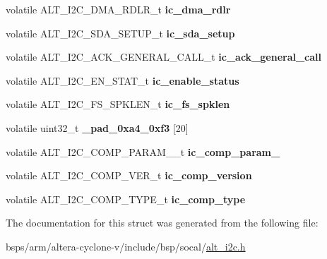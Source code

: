 \begin{DoxyCompactItemize}
\item 
\mbox{\label{structALT__I2C__s_a0cb8118328eaa91abb451ff4725f5c2a}} 
volatile A\+L\+T\+\_\+\+I2\+C\+\_\+\+D\+M\+A\+\_\+\+R\+D\+L\+R\+\_\+t {\bfseries ic\+\_\+dma\+\_\+rdlr}
\item 
\mbox{\label{structALT__I2C__s_a180ba8cb15d18619e3f9dcc007f8e0b6}} 
volatile A\+L\+T\+\_\+\+I2\+C\+\_\+\+S\+D\+A\+\_\+\+S\+E\+T\+U\+P\+\_\+t {\bfseries ic\+\_\+sda\+\_\+setup}
\item 
\mbox{\label{structALT__I2C__s_ad71fcaddfc19be1ef13ade18d275f947}} 
volatile A\+L\+T\+\_\+\+I2\+C\+\_\+\+A\+C\+K\+\_\+\+G\+E\+N\+E\+R\+A\+L\+\_\+\+C\+A\+L\+L\+\_\+t {\bfseries ic\+\_\+ack\+\_\+general\+\_\+call}
\item 
\mbox{\label{structALT__I2C__s_a5daffb2fd0543fcd4ef672413539f938}} 
volatile A\+L\+T\+\_\+\+I2\+C\+\_\+\+E\+N\+\_\+\+S\+T\+A\+T\+\_\+t {\bfseries ic\+\_\+enable\+\_\+status}
\item 
\mbox{\label{structALT__I2C__s_a2d890c4e979ef9c5f5b209f353ad3ef4}} 
volatile A\+L\+T\+\_\+\+I2\+C\+\_\+\+F\+S\+\_\+\+S\+P\+K\+L\+E\+N\+\_\+t {\bfseries ic\+\_\+fs\+\_\+spklen}
\item 
\mbox{\label{structALT__I2C__s_a740035c136f5668b3a93ea5d5052a997}} 
volatile uint32\+\_\+t {\bfseries \+\_\+pad\+\_\+0xa4\+\_\+0xf3} \mbox{[}20\mbox{]}
\item 
\mbox{\label{structALT__I2C__s_a4a57b4e2921ca25377fd9aab4fdbad6f}} 
volatile A\+L\+T\+\_\+\+I2\+C\+\_\+\+C\+O\+M\+P\+\_\+\+P\+A\+R\+A\+M\+\_\+\_\+t {\bfseries ic\+\_\+comp\+\_\+param\+\_}
\item 
\mbox{\label{structALT__I2C__s_ae0635d34abeceac5ca07db8055cc923e}} 
volatile A\+L\+T\+\_\+\+I2\+C\+\_\+\+C\+O\+M\+P\+\_\+\+V\+E\+R\+\_\+t {\bfseries ic\+\_\+comp\+\_\+version}
\item 
\mbox{\label{structALT__I2C__s_a4ee30252344de28254cf027d085ecbcf}} 
volatile A\+L\+T\+\_\+\+I2\+C\+\_\+\+C\+O\+M\+P\+\_\+\+T\+Y\+P\+E\+\_\+t {\bfseries ic\+\_\+comp\+\_\+type}
\end{DoxyCompactItemize}


The documentation for this struct was generated from the following file\+:\begin{DoxyCompactItemize}
\item 
bsps/arm/altera-\/cyclone-\/v/include/bsp/socal/\mbox{\hyperlink{socal_2alt__i2c_8h}{alt\+\_\+i2c.\+h}}\end{DoxyCompactItemize}
